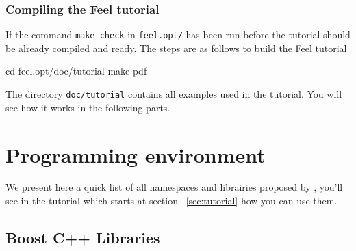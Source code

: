 


\subsubsection{Compiling the Feel tutorial}
\label{sec:comp-feel-tutor}
If the command \verb|make check| in \verb|feel.opt/| has been run before the tutorial
should be already compiled and ready. The steps are as follows  to build the Feel tutorial
\begin{unixcom}
  cd feel.opt/doc/tutorial
  make pdf
\end{unixcom}
%
The directory \verb|doc/tutorial| contains all examples used in the tutorial. You will see how it works in the following parts.

\section{Programming environment}
\label{sec:progr-envir}
We present here a quick list of all namespaces and librairies proposed by \feel, you'll see in the tutorial which starts at section ~\ref{sec:tutorial} how you can use them.
\subsection{Boost C++ Libraries}
\label{sec:boost-c++-libraries}

